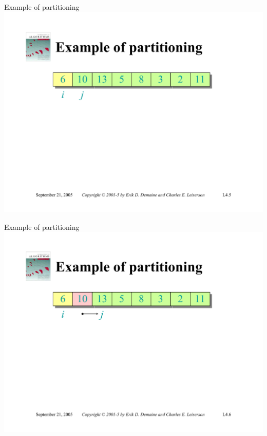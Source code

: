 \documentclass{beamer}
\begin{document}
\begin{frame}{Example of partitioning}
    \centering
    \includegraphics[width=\textwidth, trim={2.75cm 1.80cm 2.75cm 5.00cm}, clip]{pages/lec4_5}
\end{frame}
\begin{frame}{Example of partitioning}
    \centering
    \includegraphics[width=\textwidth, trim={2.75cm 1.80cm 2.75cm 5.00cm}, clip]{pages/lec4_6}
\end{frame}
\end{document}
